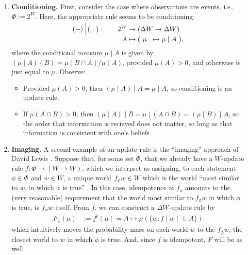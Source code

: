 \documentclass{uai2023}
\let\parencite\citep
\theoremstyle{plain}
\theoremstyle{definition}
\newcommand{\ifrac}[2]{{#1}/{#2}}
\newcommand\commentout[1]{}
\begin{document}
\begin{enumerate}
	\item \textbf{Conditioning.}
	First, consider the case where observations are events, i.e., $\Phi := 2^W$.
Here, the appropriate rule seems to be conditioning:
	\[
	\begin{aligned}
		(-) \smash{\,\Big|\,} (\;\cdot\;) : \qquad 2^W &\to (\Delta W \to \Delta W) \\
A  &\mapsto (  ~\mu~~ \mapsto \mu \mid A ~),
\end{aligned}
\]
where the conditional measure $\mu\mid A$ is given by $(\mu \mid A)(B) = \ifrac{\mu(B \cap A)}{\mu(A)}$, provided $\mu(A) > 0$,
and otherwise is just equal to $\mu$.
	Observe:
	\begin{itemize}[nosep]
		\item Provided $\mu(A) > 0$, then $(\mu\mid A) \mid A = \mu \mid A$, so conditioning is an update rule.
		\item If $\mu(A \cap B) > 0$, then $(\mu \mid A) \mid B = \mu \mid (A \cap B) = (\mu \mid B) \mid A$, so the order that information is recieved does not matter, so long as that information is consistent with one's beliefs.
	\end{itemize}


	\item
	\textbf{Imaging.}
	A second example of an update rule is the ``imaging'' approach of David Lewis
	\parencite{lewis1976probabilities}.
Suppose that, for some set $\Phi$, that we already have a $W$-update rule
	$f : \Phi \to (W \to W)$, which we interpret as assigning, to each statement $\phi \in \Phi$ and $w \in W$, a unique world $f_\phi w \in W$ which is the world ``most similar to $w$, in which $\phi$ is true'' \parencite{gardenfors1979imaging}.
	In this case, idempotence of $f_\phi$ amounts to the (very reasonable) requirement that the world most similar to $f_\phi w$ in which $\phi$ is true, is $f_\phi w$ itself.
	From $f$, we can construct a $\Delta W$-update rule by
	\[
    	\begin{aligned}
    		F_\phi(\mu) &:=
    			f^{\sharp}(\mu)
= A \mapsto \mu(\{w : f(w) \in A\})
    	\end{aligned}
\]
	which intuitively moves the probability mass on each world $w$ to the $f_\phi w$, the closest world to $w$ in which $\phi$ is true.
And, since $f$ is idempotent, $F$ will be as well.


	\commentout{
	\item More generally, consider a measurable space $\mathcal W = (W, \mathcal A)$, where $W$ is a set and $\mathcal A$ is a $\sigma$-algebra over $W$, and let $\mathcal F \subset \mathcal A$ be closed under supersets in $\mathcal A$.


}
\end{enumerate}
\end{document}
